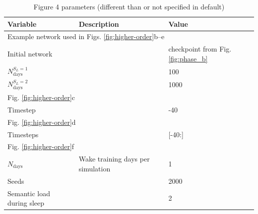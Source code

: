\documentclass{article}
\begin{document}
\begin{table}[ht]
\centering
\caption{Figure 4 parameters (different than or not specified in default)}
\label{tab:figure_4}
\begin{tabular}{lll}
\toprule
\textbf{Variable} & \textbf{Description} & \textbf{Value} \\
\midrule
\multicolumn{3}{l}{Example network used in Figs. \ref{fig:higher-order}b--e} \\
Initial network &  & checkpoint from Fig. \ref{fig:phase_b} \\
$N_\textrm{days}^{S_L=1}$ &  & 100 \\
$N_\textrm{days}^{S_L=2}$ &  & 1000 \\
\midrule
\multicolumn{3}{l}{Fig. \ref{fig:higher-order}c} \\
Timestep &  & -40\\
\midrule
\multicolumn{3}{l}{Fig. \ref{fig:higher-order}d} \\
Timesteps &  & [-40:]\\
\midrule
\multicolumn{3}{l}{Fig. \ref{fig:higher-order}f} \\
$N_\textrm{days}$ & Wake training days per simulation & 1 \\
Seeds & & 2000 \\
Semantic load during sleep &  & 2 \\
\bottomrule
\end{tabular}
\end{table}
\end{document}

